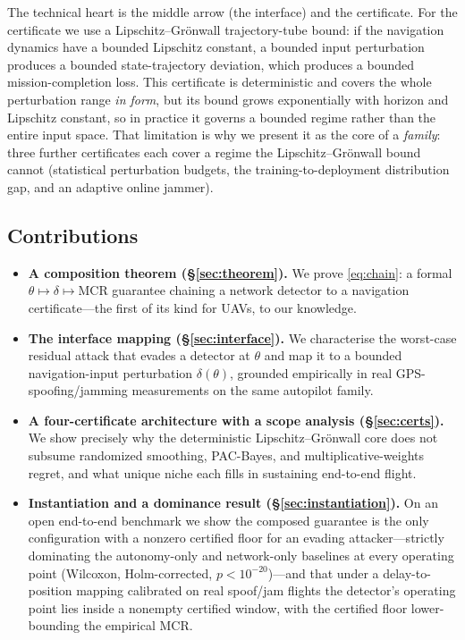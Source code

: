 \documentclass[conference]{IEEEtran}
\newcommand{\MCR}{\mathrm{MCR}}
\begin{document}
The technical heart is the middle arrow (the interface) and the certificate. For
the certificate we use a Lipschitz--Grönwall trajectory-tube bound: if the
navigation dynamics have a bounded Lipschitz constant, a bounded input
perturbation produces a bounded state-trajectory deviation, which produces a
bounded mission-completion loss. This certificate is deterministic and covers the
whole perturbation range \emph{in form}, but its bound grows exponentially with
horizon and Lipschitz constant, so in practice it governs a bounded regime rather
than the entire input space. That limitation is why we present it as the core of
a \emph{family}: three further certificates each cover a regime the
Lipschitz--Grönwall bound cannot (statistical perturbation budgets, the
training-to-deployment distribution gap, and an adaptive online jammer).

\subsection*{Contributions}
\begin{itemize}
\item \textbf{A composition theorem (\S\ref{sec:theorem}).} We prove
\eqref{eq:chain}: a formal $\theta\!\mapsto\!\delta\!\mapsto\!\MCR$ guarantee
chaining a network detector to a navigation certificate---the first of its kind
for UAVs, to our knowledge.
\item \textbf{The interface mapping (\S\ref{sec:interface}).} We characterise the
worst-case residual attack that evades a detector at $\theta$ and map it to a
bounded navigation-input perturbation $\delta(\theta)$, grounded empirically in
real GPS-spoofing/jamming measurements on the same autopilot family.
\item \textbf{A four-certificate architecture with a scope analysis
(\S\ref{sec:certs}).} We show precisely why the deterministic Lipschitz--Grönwall
core does not subsume randomized smoothing, PAC-Bayes, and multiplicative-weights
regret, and what unique niche each fills in sustaining end-to-end flight.
\item \textbf{Instantiation and a dominance result
(\S\ref{sec:instantiation}).} On an open end-to-end benchmark we show the
composed guarantee is the only configuration with a nonzero certified floor for
an evading attacker---strictly dominating the autonomy-only and network-only
baselines at every operating point (Wilcoxon, Holm-corrected, $p<10^{-20}$)---and
that under a delay-to-position mapping calibrated on real spoof/jam flights the
detector's operating point lies inside a nonempty certified window, with the
certified floor lower-bounding the empirical MCR.
\end{itemize}
\end{document}
